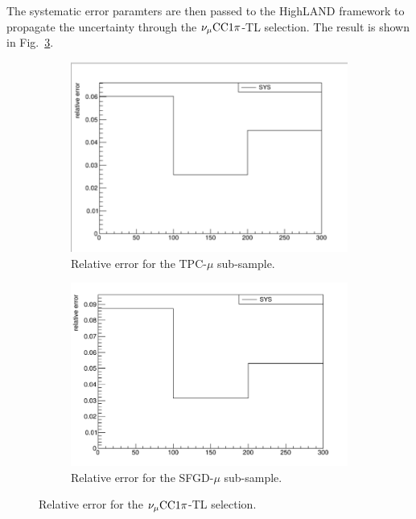           The systematic error paramters are then passed to the HighLAND framework to propagate the uncertainty through the $\nu_{\mu}\textrm{CC}1\pi$-TL selection.
          The result is shown in Fig.~\ref{fig:tlpi-relerr}.
          \begin{figure}[h]
          \centering
          \begin{subfigure}[h]{\dbfigwid\textwidth}
          \centering
          \includegraphics[width=\textwidth]{figures/sel/relerr-tpcmu.png}
          \caption{Relative error for the TPC-$\mu$ sub-sample.}
          \label{subfig:relerr-tpcmu}
          \end{subfigure}
          \hfill
          \begin{subfigure}[h]{\dbfigwid\textwidth}
          \centering
          \includegraphics[width=\textwidth]{figures/sel/relerr-sfgmu.png}
          \caption{Relative error for the SFGD-$\mu$ sub-sample.}
          \label{subfig:relerr-sfgmu}
          \end{subfigure}
          \caption{Relative error for the $\nu_{\mu}\textrm{CC}1\pi$-TL selection.}
          \label{fig:tlpi-relerr}  
          \end{figure}
